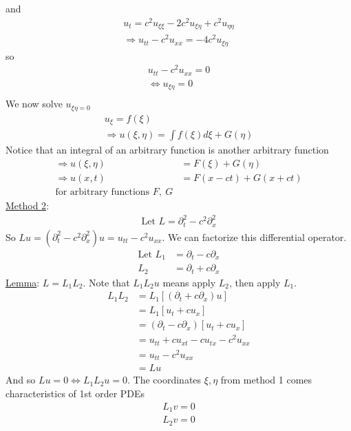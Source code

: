 \documentclass[12pt, letterpaper]{article}
\begin{document}
and 
\begin{align*}
    u_t = c^2u_{\xi\xi} - 2c^2u_{\xi\eta} + c^2u_{\eta\eta} \\
    \Rightarrow u_{tt} - c^2u_{xx} = -4c^2u_{\xi\eta}
\end{align*}
so 
\begin{align*}
    u_{tt} - c^2 u_{xx} = 0 \\
    \Leftrightarrow u_{\xi\eta} = 0 \\
\end{align*}
We now solve $u_{\xi\eta = 0}$
\begin{align*}
    u_\xi = f(\xi) \\
    \Rightarrow u(\xi,\eta) = \int f(\xi)d\xi + G(\eta)
\end{align*}
Notice that an integral of an arbitrary function is another arbitrary function
\begin{align*}
    \Rightarrow u(\xi,\eta) &= F(\xi) + G(\eta) \\
    \Rightarrow u(x,t) &= F(x-ct) + G(x+ct) \\
    \text{for arbitrary functions } F,\ G
\end{align*}
\underline{Method 2}: 
\begin{align*}
    \text{Let } L = \partial_t^2 - c^2\partial_x^2
\end{align*}
So $Lu = (\partial_t^2 - c^2\partial_x^2)u = u_{tt} - c^2u_{xx}$. We can factorize this 
differential operator.
\begin{align*}
    \text{Let } L_1 &= \partial_t - c\partial_x \\
    L_2 &= \partial_t + c\partial_x 
\end{align*}
\underline{Lemma}: $L = L_1L_2$. Note that $L_1L_2 u$ means apply $L_2$, then apply $L_1$.
\begin{align*}
    L_1L_2 &= L_1[(\partial_t + c\partial_x)u] \\
    &= L_1[u_t + cu_x] \\
    &= (\partial_t - c\partial_x)[u_t + cu_x] \\
    &= u_{tt} + cu_{xt} - cu_{tx} - c^2u_{xx} \\
    &= u_{tt} - c^2u_{xx} \\
    &= Lu
\end{align*}
And so $Lu = 0 \Leftrightarrow L_1 L_2 u = 0$. The coordinates $\xi,\eta$ from method 1 comes 
characteristics of 1st order PDEs
\begin{align*}
    L_1 v = 0 \\
    L_2 v = 0
\end{align*}
\end{document}
